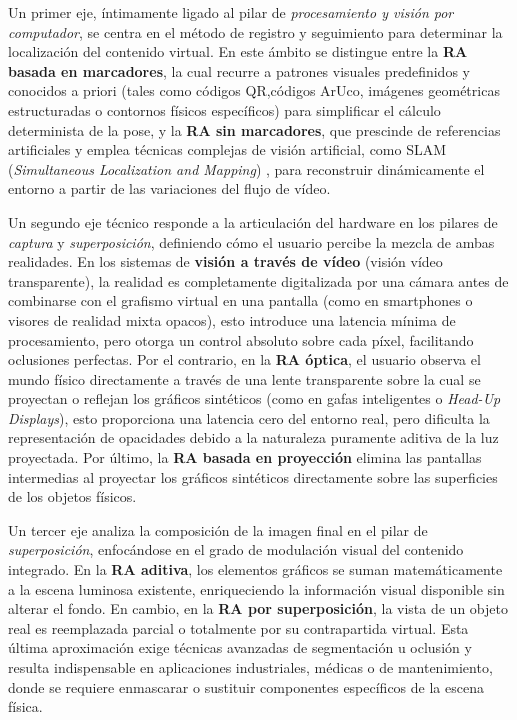 Un primer eje, íntimamente ligado al pilar de \textit{procesamiento y visión por computador}, se centra en el método de registro y seguimiento  para determinar la localización del contenido virtual. En este ámbito se distingue entre la \textbf{RA basada en marcadores}, la cual recurre a patrones visuales predefinidos y conocidos a priori (tales como códigos QR,códigos ArUco, imágenes geométricas estructuradas o contornos físicos específicos) para simplificar el cálculo determinista de la pose, y la \textbf{RA sin marcadores}, que prescinde de referencias artificiales y emplea técnicas complejas de visión artificial, como SLAM (\textit{Simultaneous Localization and Mapping}) \citep{MurArtal2015}, para reconstruir dinámicamente el entorno a partir de las variaciones del flujo de vídeo.

Un segundo eje técnico responde a la articulación del hardware en los pilares de \textit{captura} y \textit{superposición}, definiendo cómo el usuario percibe la mezcla de ambas realidades. En los sistemas de \textbf{visión a través de vídeo} (visión vídeo transparente), la realidad es completamente digitalizada por una cámara antes de combinarse con el grafismo virtual en una pantalla (como en smartphones o visores de realidad mixta opacos), esto introduce una latencia mínima de procesamiento, pero otorga un control absoluto sobre cada píxel, facilitando oclusiones perfectas. Por el contrario, en la \textbf{RA óptica}, el usuario observa el mundo físico directamente a través de una lente transparente sobre la cual se proyectan o reflejan los gráficos sintéticos (como en gafas inteligentes o \textit{Head-Up Displays}), esto proporciona una latencia cero del entorno real, pero dificulta la representación de opacidades debido a la naturaleza puramente aditiva de la luz proyectada. Por último, la \textbf{RA basada en proyección} elimina las pantallas intermedias al proyectar los gráficos sintéticos directamente sobre las superficies de los objetos físicos.

Un tercer eje analiza la composición de la imagen final en el pilar de \textit{superposición}, enfocándose en el grado de modulación visual del contenido integrado. En la \textbf{RA aditiva}, los elementos gráficos se suman matemáticamente a la escena luminosa existente, enriqueciendo la información visual disponible sin alterar el fondo. En cambio, en la \textbf{RA por superposición}, la vista de un objeto real es reemplazada parcial o totalmente por su contrapartida virtual. Esta última aproximación exige técnicas avanzadas de segmentación u oclusión y resulta indispensable en aplicaciones industriales, médicas o de mantenimiento, donde se requiere enmascarar o sustituir componentes específicos de la escena física.


